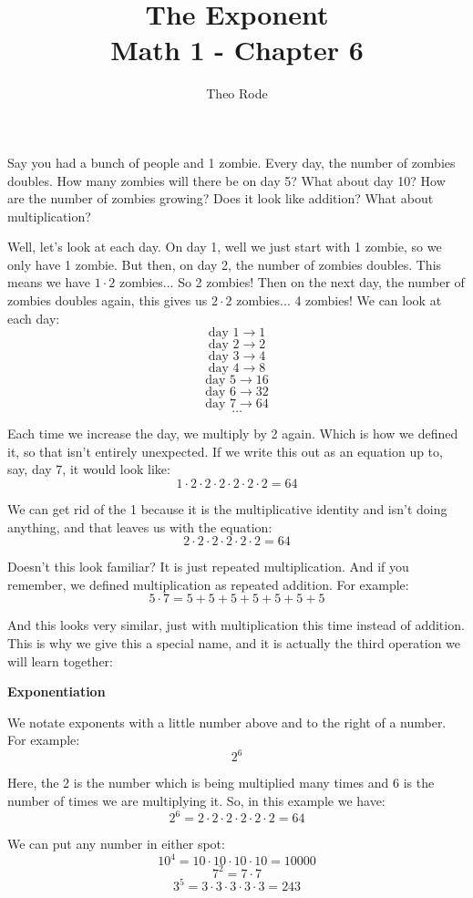 \documentclass{article}
\title{\textbf{The Exponent} \\ \large Math 1 - Chapter 6}
\author{Theo Rode}
\date{}
\begin{document}
\maketitle 

Say you had a bunch of people and 1 zombie. Every day, the number of zombies doubles. 
How many zombies will there be on day 5? What about day 10? How are the number of zombies growing? Does it look like addition? What about multiplication? 

Well, let's look at each day. On day 1, well we just start with 1 zombie, so we only have 1 zombie. But then, on day 2, the number of zombies doubles. This means we have $1 \cdot 2$ 
zombies... So 2 zombies! Then on the next day, the number of zombies doubles again, this gives us $2 \cdot 2$ zombies... 4 zombies! We can look at each day: 
\[ \text{day 1} \to 1 \]
\[ \text{day 2} \to 2 \]
\[ \text{day 3} \to 4 \]
\[ \text{day 4} \to 8 \]
\[ \text{day 5} \to 16 \]
\[ \text{day 6} \to 32 \]
\[ \text{day 7} \to 64 \]
\[ \ldots \]

Each time we increase the day, we multiply by 2 again. Which is how we defined it, so that isn't entirely unexpected. 
If we write this out as an equation up to, say, day 7, it would look like: 
\[ 1 \cdot 2 \cdot 2 \cdot 2 \cdot 2 \cdot 2 \cdot 2 = 64 \]

We can get rid of the 1 because it is the multiplicative identity and isn't doing anything, and that leaves us with the equation: 
\[ 2 \cdot 2 \cdot 2 \cdot 2 \cdot 2 \cdot 2 = 64 \]

Doesn't this look familiar? It is just repeated multiplication. And if you remember, we defined multiplication as repeated addition. For example: 
\[ 5 \cdot 7 = 5 + 5 + 5 + 5 + 5 + 5 + 5 \]

And this looks very similar, just with multiplication this time instead of addition. This is why we give this a special name, and it is actually the third operation we will learn together: 
\begin{center}
    \textbf{Exponentiation}
\end{center}

We notate exponents with a little number above and to the right of a number. For example: 
\[ 2^6 \]

Here, the 2 is the number which is being multiplied many times and 6 is the number of times we are multiplying it. So, in this example we have: 
\[ 2^6 = 2 \cdot 2 \cdot 2 \cdot 2 \cdot 2 \cdot 2 = 64 \]

We can put any number in either spot: 
\[ 10^4 = 10 \cdot 10 \cdot 10 \cdot 10 = 10000 \]
\[ 7^2 = 7 \cdot 7 \]
\[ 3^5 = 3 \cdot 3 \cdot 3 \cdot 3 \cdot 3 = 243 \]
\end{document}
